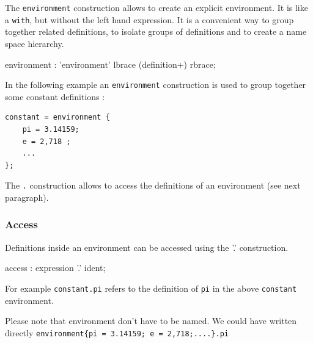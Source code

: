 \documentclass[a4paper,10pt]{book}
\begin{document}
The \lstinline'environment' construction allows to create an explicit environment. It is like a \lstinline'with', but without the left hand expression. It is a convenient way to group together related definitions, to isolate groups of definitions and to create a name space hierarchy. 


\begin{rail}
environment : 'environment' lbrace (definition+) rbrace; 
\end{rail}

In the following example an \lstinline'environment' construction is used to group together some constant definitions :

\begin{lstlisting}
constant = environment {
	pi = 3.14159;
	e = 2,718 ;
	...
};
\end{lstlisting}
The  \lstinline'.' construction allows to access the definitions of an environment (see next paragraph).

\subsubsection{Access} 
Definitions inside an environment can be accessed using 
the '.' construction. 


\begin{rail}
access :    expression '.' ident;       
\end{rail}

For example \lstinline'constant.pi' refers to the definition of \lstinline'pi' in the above \lstinline'constant' environment.

Please note that environment don't have to be named. We could have written directly 
\lstinline'environment{pi = 3.14159; e = 2,718;....}.pi'
\end{document}
